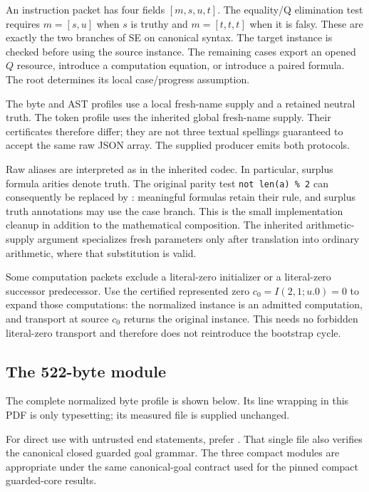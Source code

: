 \documentclass[11pt,letterpaper]{article}
\theoremstyle{definition}
\newcommand{\code}[1]{\texttt{\detokenize{#1}}}
\begin{document}
An instruction packet has four fields $[m,s,u,t]$. The equality/Q
elimination test requires $m=[s,u]$ when $s$ is truthy and $m=[t,t,t]$
when it is falsy. These are exactly the two branches of SE on canonical
syntax. The target instance is checked before using the source instance.
The remaining cases export an opened $Q$ resource, introduce a computation
equation, or introduce a paired formula. The root determines its local
case/progress assumption.

The byte and AST profiles use a local fresh-name supply and a retained
neutral truth. The token profile uses the inherited global fresh-name
supply. Their certificates therefore differ; they are not three textual
spellings guaranteed to accept the same raw JSON array. The supplied
producer emits both protocols.

Raw aliases are interpreted as in the inherited codec. In particular,
surplus formula arities denote truth. The original parity test
\verb|not len(a) % 2| can consequently be replaced by
\code{len(a) == 2}: meaningful formulas retain their rule, and surplus
truth annotations may use the case branch. This is the small implementation
cleanup in addition to the mathematical composition. The inherited
arithmetic-supply argument specializes fresh parameters only after
translation into ordinary arithmetic, where that substitution is valid.

Some computation packets exclude a literal-zero initializer or a
literal-zero successor predecessor. Use the certified represented zero
$c_0=I(2,1;u.0)=0$ to expand those computations: the normalized instance
is an admitted computation, and transport at source $c_0$ returns the
original instance. This needs no forbidden literal-zero transport and
therefore does not reintroduce the bootstrap cycle.

\subsection{The 522-byte module}

The complete normalized byte profile is shown below. Its line wrapping in
this PDF is only typesetting; its measured file is supplied unchanged.


For direct use with untrusted end statements, prefer
. That single file also verifies the canonical
closed guarded goal grammar. The three compact modules are appropriate
under the same canonical-goal contract used for the pinned compact
guarded-core results.
\end{document}
